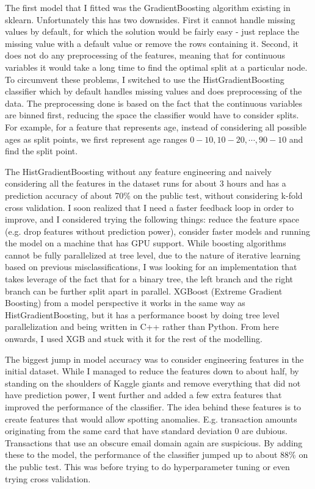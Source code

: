 \documentclass[11pt,a4paper]{article}
\begin{document}
The first model that I fitted was the GradientBoosting algorithm existing in sklearn. Unfortunately this has two downsides. First it cannot handle missing values by default, for which the solution would be fairly easy - just replace the missing value with a default value or remove the rows containing it. Second, it does not do any preprocessing of the features, meaning that for continuous variables it would take a long time to find the optimal split at a particular node. To circumvent these problems, I switched to use the HistGradientBoosting classifier which by default handles missing values and does preprocessing of the data. The preprocessing done is based on the fact that the continuous variables are binned first, reducing the space the classifier would have to consider splits. For example, for a feature that represents age, instead of considering all possible ages as split points, we first represent age ranges $0-10, 10-20, \cdots , 90-10$ and find the split point.

The HistGradientBoosting without any feature engineering and naively considering all the features in the dataset runs for about 3 hours and has a prediction accuracy of about 70\% on the public test, without considering k-fold cross validation. I soon realized that I need a faster feedback loop in order to improve, and I considered trying the following things: reduce the feature space (e.g. drop features without prediction power), consider faster models and running the model on a machine that has GPU support. While boosting algorithms cannot be fully parallelized at tree level, due to the nature of iterative learning based on previous misclassifications, I was looking for an implementation that takes leverage of the fact that for a binary tree, the left branch and the right branch can be further split apart in parallel. XGBoost (Extreme Gradient Boosting) from a model perspective it works in the same way as HistGradientBoosting, but it has a performance boost by doing tree level parallelization and being written in C++ rather than Python. From here onwards, I used XGB and stuck with it for the rest of the modelling.

The biggest jump in model accuracy was to consider engineering features in the initial dataset. While I managed to reduce the features down to about half, by standing on the shoulders of Kaggle giants and remove everything that did not have prediction power, I went further and added a few extra features that improved the performance of the classifier. The idea behind these features is to create features that would allow spotting anomalies. E.g. transaction amounts originating from the same card that have standard deviation 0 are dubious. Transactions that use an obscure email domain again are suspicious. By adding these to the model, the performance of the classifier jumped up to about 88\% on the public test. This was before trying to do hyperparameter tuning or even trying cross validation. 
\end{document}
